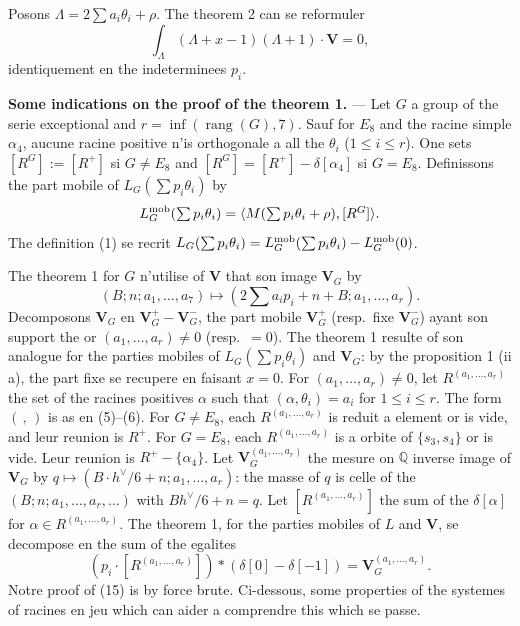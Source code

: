 \documentclass[11pt,a4paper]{article}
\theoremstyle{plain}
\theoremstyle{definition}
\DeclareMathOperator{\rank}{rang}
\newcommand{\rang}{\rank}
\begin{document}
Posons $\Lambda = 2\sum a_i \theta_i + \rho$. The theorem 2 can se reformuler
\begin{equation}\label{eq:12}
\int_\Lambda (\Lambda + x - 1)(\Lambda + 1) \cdot \mathbf{V} = 0,
\end{equation}
identiquement en the indeterminees $p_i$.

\bigskip

\textbf{Some indications on the proof of the theorem 1.} --- Let $G$ a group of the serie exceptional and $r = \inf(\rang(G),7)$. Sauf for $E_8$ and the racine simple $\alpha_4$, aucune racine positive n'is orthogonale a all the $\theta_i$ ($1 \leq i \leq r$). One sets $[R^G] := [R^+]$ si $G \not= E_8$ and $[R^G] = [R^+] - \delta[\alpha_4]$ si $G = E_8$. Definissons the part mobile of $L_G(\sum p_i \theta_i)$ by
\begin{equation}\label{eq:13}
L_G^{\textup{mob}}(\textstyle\sum p_i \theta_i) = \langle M(\sum p_i \theta_i + \rho), [R^G] \rangle.
\end{equation}
The definition (1) se recrit $L_G(\sum p_i \theta_i) = L_G^{\textup{mob}}(\sum p_i \theta_i) - L_G^{\textup{mob}}(0)$.

The theorem 1 for $G$ n'utilise of $\mathbf{V}$ that son image $\mathbf{V}_G$ by
\begin{equation}\label{eq:14}
(B; n; a_1,\dots,a_7) \mapsto (2\textstyle\sum a_i p_i + n + B; a_1,\dots,a_r).
\end{equation}
Decomposons $\mathbf{V}_G$ en $\mathbf{V}_G^+ - \mathbf{V}_G^-$, the part mobile $\mathbf{V}_G^+$ (resp.\ fixe $\mathbf{V}_G^-$) ayant son support the or $(a_1,\dots,a_r) \not= 0$ (resp.\ $= 0$). The theorem 1 resulte of son analogue for the parties mobiles of $L_G(\sum p_i \theta_i)$ and $\mathbf{V}_G$: by the proposition 1 (ii a), the part fixe se recupere en faisant $x = 0$. For $(a_1,\dots,a_r) \not= 0$, let $R^{(a_1,\dots,a_r)}$ the set of the racines positives $\alpha$ such that $(\alpha, \theta_i) = a_i$ for $1 \leq i \leq r$. The form $(\, , \,)$ is as en (5)--(6). For $G \not= E_8$, each $R^{(a_1,\dots,a_r)}$ is reduit a element or is vide, and leur reunion is $R^+$. For $G = E_8$, each $R^{(a_1,\dots,a_r)}$ is a orbite of $\{s_3, s_4\}$ or is vide. Leur reunion is $R^+ - \{\alpha_4\}$. Let $\mathbf{V}_G^{(a_1,\dots,a_r)}$ the mesure on $\mathbb{Q}$ inverse image of $\mathbf{V}_G$ by $q \mapsto (B\cdot h^\vee/6 + n; a_1,\dots,a_r)$: the masse of $q$ is celle of the $(B; n; a_1,\dots,a_r,\dots)$ with $Bh^\vee/6 + n = q$. Let $[R^{(a_1,\dots,a_r)}]$ the sum of the $\delta[\alpha]$ for $\alpha \in R^{(a_1,\dots,a_r)}$. The theorem 1, for the parties mobiles of $L$ and $\mathbf{V}$, se decompose en the sum of the egalites
\begin{equation}\label{eq:15}
(p_i \cdot [R^{(a_1,\dots,a_r)}]) * (\delta[0] - \delta[-1]) = \mathbf{V}_G^{(a_1,\dots,a_r)}.
\end{equation}
Notre proof of (15) is by force brute. Ci-dessous, some properties of the systemes of racines en jeu which can aider a comprendre this which se passe.
\end{document}
